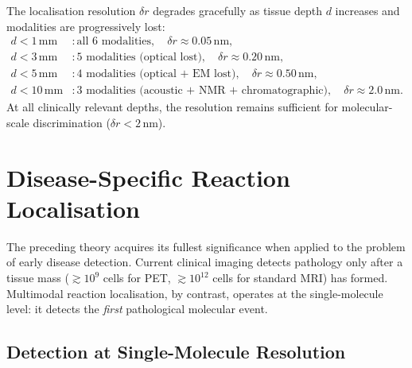 \begin{proposition}
\label{prop:ch06-graceful-degradation}
The localisation resolution $\delta r$ degrades gracefully as tissue depth $d$
increases and modalities are progressively lost:
\begin{align*}
  d < 1\,\text{mm} &: \text{all 6 modalities}, \quad \delta r \approx 0.05\,\text{nm},\\
  d < 3\,\text{mm} &: \text{5 modalities (optical lost)}, \quad \delta r \approx 0.20\,\text{nm},\\
  d < 5\,\text{mm} &: \text{4 modalities (optical + EM lost)}, \quad \delta r \approx 0.50\,\text{nm},\\
  d < 10\,\text{mm}&: \text{3 modalities (acoustic + NMR + chromatographic)},
                      \quad \delta r \approx 2.0\,\text{nm}.
\end{align*}
At all clinically relevant depths, the resolution remains sufficient for
molecular-scale discrimination ($\delta r < 2\,\text{nm}$).
\end{proposition}

\section{Disease-Specific Reaction Localisation}
\label{sec:ch06-disease-localization-clinical}

The preceding theory acquires its fullest significance when applied to the
problem of early disease detection.  Current clinical imaging detects
pathology only after a tissue mass ($\gtrsim 10^9$ cells for PET, $\gtrsim
10^{12}$ cells for standard MRI) has formed.  Multimodal reaction localisation,
by contrast, operates at the single-molecule level: it detects the
\emph{first} pathological molecular event.

\subsection{Detection at Single-Molecule Resolution}
\label{sec:ch06-single-molecule-detection}

